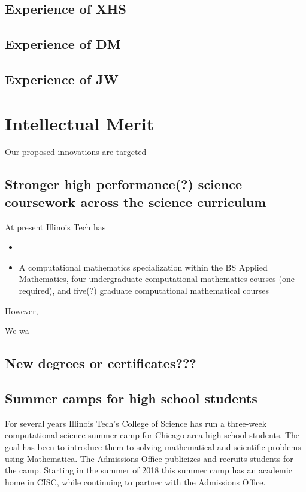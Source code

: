 \documentclass[11pt]{NSFamsart}
\begin{document}
\subsection{Experience of XHS}

\subsection{Experience of DM}

\subsection{Experience of JW}



\section{Intellectual Merit}
Our proposed innovations are targeted 

\subsection{Stronger high performance(?) science coursework across the science curriculum} At present Illinois Tech has   
\begin{itemize} 

\item {}

\item A computational mathematics specialization within the BS Applied Mathematics, four undergraduate computational mathematics courses (one required), and five(?) graduate computational mathematical courses

\end{itemize}

However, 

We wa
\subsection{New degrees or certificates???}

\subsection{Summer camps for high school students} For several years Illinois Tech's College of Science has run a three-week computational science summer camp for Chicago area high school students.  The goal has been to introduce them to solving mathematical and scientific problems using Mathematica.  The Admissions Office publicizes and recruits students for the camp.  Starting in the summer of 2018 this summer camp has an academic home in CISC, while continuing to partner with the Admissions Office.
\end{document}
